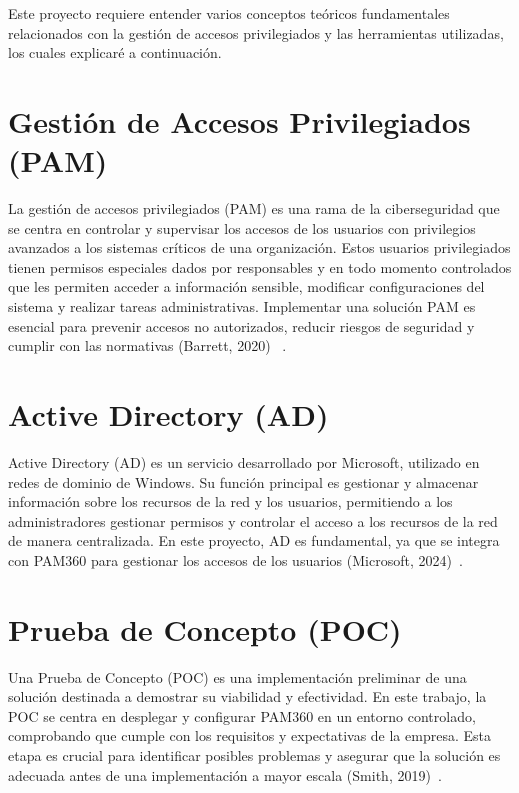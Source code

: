 
Este proyecto requiere entender varios conceptos teóricos fundamentales relacionados con la gestión de accesos privilegiados y las herramientas utilizadas, los cuales explicaré a continuación.

\section{Gestión de Accesos Privilegiados (PAM)}
La gestión de accesos privilegiados (PAM) es una rama de la ciberseguridad que se centra en controlar y supervisar los accesos de los usuarios con privilegios avanzados a los sistemas críticos de una organización. Estos usuarios privilegiados tienen permisos especiales dados por responsables y en todo momento controlados que les permiten acceder a información sensible, modificar configuraciones del sistema y realizar tareas administrativas. Implementar una solución PAM es esencial para prevenir accesos no autorizados, reducir riesgos de seguridad y cumplir con las normativas (Barrett, 2020)~\cite{barrett2020pam} .

\section{Active Directory (AD)}
Active Directory (AD) es un servicio desarrollado por Microsoft, utilizado en redes de dominio de Windows. Su función principal es gestionar y almacenar información sobre los recursos de la red y los usuarios, permitiendo a los administradores gestionar permisos y controlar el acceso a los recursos de la red de manera centralizada. En este proyecto, AD es fundamental, ya que se integra con PAM360 para gestionar los accesos de los usuarios (Microsoft, 2024)~\cite{microsoft2024ad}.

\section{Prueba de Concepto (POC)}
Una Prueba de Concepto (POC) es una implementación preliminar de una solución destinada a demostrar su viabilidad y efectividad. En este trabajo, la POC se centra en desplegar y configurar PAM360 en un entorno controlado, comprobando que cumple con los requisitos y expectativas de la empresa. Esta etapa es crucial para identificar posibles problemas y asegurar que la solución es adecuada antes de una implementación a mayor escala (Smith, 2019)~\cite{smith2019poc}.

